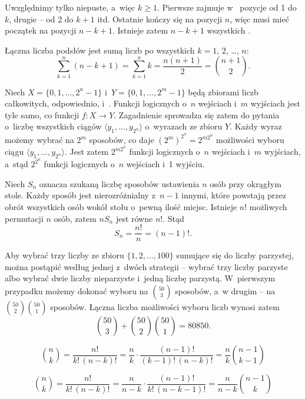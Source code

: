 
\exercise %
Uwzględnimy tylko  niepuste, a~więc $k\ge1$.
Pierwsze  zajmuje w~ pozycje od 1 do $k$, drugie -- od 2 do $k+1$ itd.
Ostatnie  kończy się na pozycji $n$, więc musi mieć początek na pozycji $n-k+1$.
Istnieje zatem $n-k+1$ wszystkich  .

Łączna liczba podsłów  jest sumą liczb  po wszystkich $k=1$, 2, \dots, $n$:
\[
	\sum_{k=1}^n(n-k+1) = \sum_{k=1}^nk = \frac{n(n+1)}{2} = \binom{n+1}{2}.
\]

\exercise %
Niech $X=\{0,1,\dots,2^n-1\}$ i~$Y=\{0,1,\dots,2^m-1\}$ będą zbiorami liczb całkowitych, odpowiednio,  i~.
Funkcji logicznych o~$n$ wejściach i~$m$ wyjściach jest tyle samo, co funkcji $f\colon X\to Y$.
Zagadnienie sprowadza się zatem do pytania o~liczbę wszystkich ciągów $\langle y_1,\dots,y_{2^n}\!\rangle$ o~wyrazach ze zbioru $Y$.
Każdy wyraz możemy wybrać na $2^m$ sposobów, co daje $(2^m)^{2^n}=2^{m2^n}\!$ możliwości wyboru ciągu $\langle y_1,\dots,y_{2^n}\!\rangle$.
Jest zatem $2^{m2^n}\!$ funkcji logicznych o~$n$ wejściach i~$m$ wyjściach, a~stąd $2^{2^n}\!$ funkcji logicznych o~$n$ wejściach i~1 wyjściu.

\exercise %
Niech $S_n$ oznacza szukaną liczbę sposobów ustawienia $n$ osób przy okrągłym stole.
Każdy sposób jest nierozróżnialny z~$n-1$ innymi, które powstają przez obrót wszystkich osób wokół stołu o~pewną ilość miejsc.
Istnieje $n!$ możliwych permutacji $n$ osób, zatem $nS_n$ jest równe $n!$.
Stąd
\[
	S_n = \frac{n!}{n} = (n-1)!.
\]

\exercise %
Aby wybrać trzy liczby ze zbioru $\{1,2,\dots,100\}$ sumujące się do liczby parzystej, można postąpić według jednej z~dwóch strategii -- wybrać trzy liczby parzyste albo wybrać dwie liczby nieparzyste i~jedną liczbę parzystą.
W~pierwszym przypadku możemy dokonać wyboru na $\binom{50}{3}$ sposobów, a~w drugim -- na $\binom{50}{2}\binom{50}{1}$ sposobów.
Łączna liczba możliwości wyboru liczb wynosi zatem
\[
	\binom{50}{3}+\binom{50}{2}\binom{50}{1} = 80850.
\]

\exercise %
\[
	\binom{n}{k} = \frac{n!}{k!\,(n-k)!} = \frac{n}{k}\cdot\frac{(n-1)!}{(k-1)!\,(n-k)!} = \frac{n}{k}\binom{n-1}{k-1}
\]

\exercise %
\[
	\binom{n}{k} = \frac{n!}{k!\,(n-k)!} = \frac{n}{n-k}\cdot\frac{(n-1)!}{k!\,(n-k-1)!} = \frac{n}{n-k}\binom{n-1}{k}
\]

